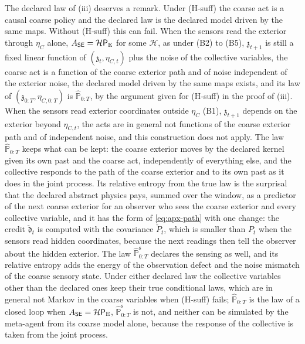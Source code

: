 The declared law of (iii) deserves a remark. Under (H-suff) the coarse act is a causal coarse policy and the declared law is the declared model driven by the same maps. Without (H-suff) this can fail. When the sensors read the exterior through $\eta_C$ alone, $A_{\mathsf{S}\mathsf{E}}=\mathcal H\mathsf P_{\mathrm E}$ for some $\mathcal H$, as under (B2) to (B5), $\mathfrak z_{t+1}$ is still a fixed linear function of $(\mathfrak z_t,\eta_{C,t})$ plus the noise of the collective variables, the coarse act is a function of the coarse exterior path and of noise independent of the exterior noise, the declared model driven by the same maps exists, and its law of $(\mathfrak z_{0:T},\eta_{C,0:T})$ is $\hat{\mathbb P}_{0:T}$, by the argument given for (H-suff) in the proof of (iii). When the sensors read exterior coordinates outside $\eta_C$ (B1), $\mathfrak z_{t+1}$ depends on the exterior beyond $\eta_{C,t}$, the acts are in general not functions of the coarse exterior path and of independent noise, and this construction does not apply. The law $\hat{\mathbb P}_{0:T}$ keeps what can be kept: the coarse exterior moves by the declared kernel given its own past and the coarse act, independently of everything else, and the collective responds to the path of the coarse exterior and to its own past as it does in the joint process. Its relative entropy from the true law is the surprisal that the declared abstract physics pays, summed over the window, as a predictor of the next coarse exterior for an observer who sees the coarse exterior and every collective variable, and it has the form of \eqref{eq:apx-path} with one change: the credit $\check{\mathfrak d}_t$ is computed with the covariance $\check P_t$, which is smaller than $P_t$ when the sensors read hidden coordinates, because the next readings then tell the observer about the hidden exterior. The law $\hat{\mathbb P}^{\mathrm s}_{0:T}$ declares the sensing as well, and its relative entropy adds the energy of the observation defect and the noise mismatch of the coarse sensory state. Under either declared law the collective variables other than the declared ones keep their true conditional laws, which are in general not Markov in the coarse variables when (H-suff) fails; $\hat{\mathbb P}_{0:T}$ is the law of a closed loop when $A_{\mathsf{S}\mathsf{E}}=\mathcal H\mathsf P_{\mathrm E}$, $\hat{\mathbb P}^{\mathrm s}_{0:T}$ is not, and neither can be simulated by the meta-agent from its coarse model alone, because the response of the collective is taken from the joint process.

